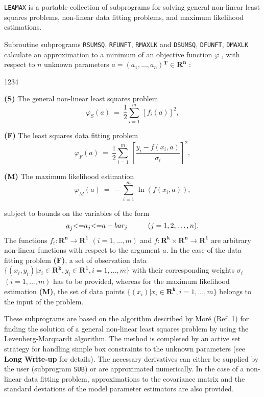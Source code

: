                                 
                   
                           
{\tt LEAMAX} is a portable collection of
subprograms for solving general non-linear least squares problems,
non-linear data fitting problems, and maximum likelihood estimations.
 
Subroutine subprograms
{\tt RSUMSQ}, {\tt RFUNFT}, {\tt RMAXLK} and
{\tt DSUMSQ}, {\tt DFUNFT}, {\tt DMAXLK}
calculate an approximation to a minimum of an  objective function
$\varphi$ , with respect to $n$ unknown parameters
$a = (a_1,...,a_n) \mathbf{^T} \in \mathbf{R^n}$ : \\ [3mm]
\begin{DL}{1234}
\item[{\bf (S)}] The general non-linear least squares problem
$$ \varphi_S(a) \ = \ \frac{1}{2}
\sum_{i=1}^m\, [f_i(a)]^2,$$
\item[{\bf (F)}] The least squares data fitting problem
$$ \varphi_F(a) \ = \ \frac{1}{2} \sum_{i=1}^m\,
\left[\frac{y_i-f(x_i,a)}{\sigma_i}\right]^2,$$
\item[{\bf (M)}] The maximum likelihood estimation
$$ \varphi_M(a) \ = \ -\sum_{i=1}^m\, \ln (f(x_i,a)),$$
\end{DL}
subject to bounds on the variables of the form
$$ \underline{a}_j \le a_j \le \overline{a}_j
   \mbox{\hspace{1cm}} (j=1,2,\ldots,n).$$
The functions $f_i : \mathbf{R^n} \to \mathbf{R^1}$ $(i=1,...,m)$
and $f : \mathbf{R^k} \times \mathbf{R^n} \to \mathbf{R^1}$ are
arbitrary non-linear functions with respect to the argument $a$.
In the case of the data fitting problem {\bf (F)}, a set of observation
data $\{(x_i,y_i) | x_i \in \mathbf{R^k},
y_i \in \mathbf{R^1},i=1,...,m \}$ with their corresponding
weights $\sigma_i$ $(i=1,...,m)$ has to be provided,
whereas for the maximum likelihood estimation {\bf (M)}, the set of data
points $\{(x_i) | x_i \in \mathbf{R^k},i=1,...,m\}$ belongs to the input
of the problem.
 
These subprograms are based on the algorithm described by
Mor\'e (Ref. 1) for finding the solution of a general non-linear least
squares problem by using the Levenberg-Marquardt algorithm.
The method is completed
by an active set strategy for handling simple box constraints to the
unknown parameters (see {\bf Long Write-up} for details).
The necessary derivatives can either be supplied by the user
(subprogram {\tt SUB}) or are approximated numerically.
In the case of a non-linear data fitting problem, approximations to
the covariance matrix and the standard deviations of the model
parameter estimators are also provided.
 
